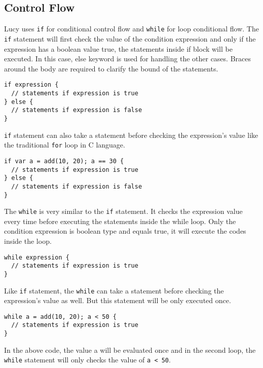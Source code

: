 \subsection{Control Flow}
Lucy uses \texttt{if} for conditional control flow and \texttt{while} for loop conditional flow. The \texttt{if} statement will first check the value of the condition expression and only if the expression has a boolean value true, the statements inside if block will be executed. In this case, else keyword is used for handling the other cases. Braces around the body are required to clarify the bound of the statements.
\begin{lstlisting}
if expression {
  // statements if expression is true
} else {
  // statements if expression is false
}
\end{lstlisting}
\texttt{if} statement can also take a statement before checking the expression's value like the traditional \texttt{for} loop in C language.
\begin{lstlisting}
if var a = add(10, 20); a == 30 {
  // statements if expression is true
} else {
  // statements if expression is false
}
\end{lstlisting}
The \texttt{while} is very similar to the \texttt{if} statement. It checks the expression value every time before executing the statements inside the while loop. Only the condition expression is boolean type and equals true, it will execute the codes inside the loop.
\begin{lstlisting}
while expression {
  // statements if expression is true
}
\end{lstlisting}
Like \texttt{if} statement, the \texttt{while} can take a statement before checking the expression's value as well. But this statement will be only executed once.
\begin{lstlisting}
while a = add(10, 20); a < 50 {
  // statements if expression is true
}
\end{lstlisting}
In the above code, the value a will be evaluated once and in the second loop, the \texttt{while} statement will only checks the value of \texttt{a < 50}.

